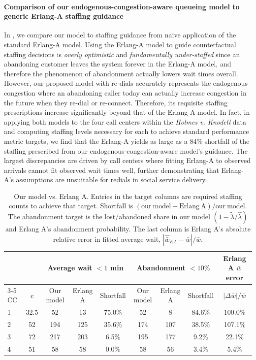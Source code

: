 \documentclass[manuscript,screen,authorversion]{acmart}
\begin{document}
\paragraph{Comparison of our endogenous-congestion-aware queueing model to generic Erlang-A staffing guidance}
In , we compare our model to staffing guidance from naive application of the standard Erlang-A model. Using the Erlang-A model to guide counterfactual staffing decisions is \textit{overly optimistic} and \emph{fundamentally under-staffed} since an abandoning customer leaves the system forever in the Erlang-A model, and therefore the phenomenon of abandonment actually lowers wait times overall. However, our proposed model with re-dials accurately represents the endogenous congestion where an abandoning caller today can actually increase congestion in the future when they re-dial or re-connect. Therefore, its requisite staffing prescriptions increase significantly beyond that of the Erlang-A model. In fact, in applying both models to the four call centers within the \emph{Holmes v. Knodell} data and computing staffing levels necessary for each to achieve standard performance metric targets, we find that the Erlang-A yields as large as a 84\% shortfall of the staffing prescribed from our endogenous-congestion-aware model's guidance. The largest discrepancies are driven by call centers where fitting Erlang-A to observed arrivals cannot fit observed wait times well, further demonstrating that Erlang-A's assumptions are unsuitable for redials in social service delivery.
  \begin{table}[htbp]
  \centering
  \caption{Our model vs. Erlang A. Entries
  in the target columns are required staffing counts to achieve that target. Shortfall is
  $(\mathrm{our\ model}-\mathrm{Erlang\ A})/\mathrm{our\ model}$. The
  abandonment target is the lost/abandoned share in our model $(1-\tilde \lambda /  \hat \lambda)$ and Erlang A's
  abandonment probability. The last column is Erlang A's absolute relative error
  in fitted average wait, $|\widehat{\bar w}_{EA}-\bar w|/\bar w$.}
  \label{tab:compact_staffing_benchmark}
  \begin{tabular}{lc ccc ccc c}
  \toprule
  && \multicolumn{3}{c}{Average wait $<1$ min} & \multicolumn{3}{c}{Abandonment
  $<10\%$} & \multicolumn{1}{c}{Erlang A $\bar w$ error} \\
  \cline{3-5}\cline{6-8}\cline{9-9}
  CC & $c$ & Our model & Erlang A & Shortfall & Our model &
  Erlang A & Shortfall & $|\Delta \bar w|/\bar w$ \\
  \hline
  1 & 32.5 & 52 & 13 & 75.0\% & 52 & 8 & 84.6\% & 100.0\% \\
  2 & 52 & 194 & 125 & 35.6\% & 174 & 107 & 38.5\% & 107.1\% \\
  3 & 72 & 217 & 203 & 6.5\% & 195 & 177 & 9.2\% & 22.1\% \\
  4 & 51 & 58 & 58 & 0.0\% & 58 & 56 & 3.4\% & 5.4\% \\
  \bottomrule
  \end{tabular}
\vspace{-0.1in}
  \end{table}
\end{document}
